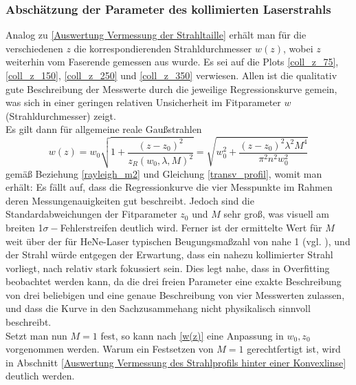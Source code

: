\documentclass[11pt,a4paper,oneside]{scrartcl}
\begin{document}
\subsubsection{Abschätzung der Parameter des kollimierten Laserstrahls}\label{Auswertung Abschätzung der Parameter des kollimierten Laserstrahls}
Analog zu \ref{Auswertung Vermessung der Strahltaille} erhält man für die verschiedenen $z$ die korrespondierenden Strahldurchmesser $w(z)$, wobei $z$ weiterhin vom Faserende gemessen aus wurde. Es sei auf die Plots \ref{coll_z_75}, \ref{coll_z_150}, \ref{coll_z_250} und \ref{coll_z_350} verwiesen. Allen ist die qualitativ gute Beschreibung der Messwerte durch die jeweilige Regressionskurve gemein, was sich in einer geringen relativen Unsicherheit im Fitparameter $w$ (Strahldurchmesser) zeigt.\\
Es gilt dann für allgemeine reale Gaußstrahlen
\begin{equation}\label{w(z)}
w(z)=w_0\sqrt{1+\frac{(z-z_0)^2}{z_R(w_0,\lambda,M)^2}}=\sqrt{w_0^2+\frac{(z-z_0)^2\lambda^2M^4}{\pi^2n^2w_0^2}}
\end{equation}
gemäß Beziehung \ref{rayleigh_m2} und Gleichung \ref{transv_profil}, womit man  erhält: 
Es fällt auf, dass die Regressionkurve die vier Messpunkte im Rahmen deren Messungenauigkeiten gut beschreibt. Jedoch sind die Standardabweichungen der Fitparameter $z_0$ und $M$ sehr groß, was visuell am breiten 1$\sigma-$Fehlerstreifen deutlich wird. Ferner ist der ermittelte Wert für $M$ weit über der für HeNe-Laser typischen Beugungsmaßzahl von nahe 1 (vgl. \cite{paschotta2008beam}), und der Strahl würde entgegen der Erwartung, dass ein nahezu kollimierter Strahl vorliegt, nach  relativ stark fokussiert sein. Dies legt nahe, dass in  Overfitting beobachtet werden kann, da die drei freien Parameter eine exakte Beschreibung von drei beliebigen und eine genaue Beschreibung von vier Messwerten zulassen, und dass die Kurve in  den Sachzusammehang nicht physikalisch sinnvoll beschreibt.\\
Setzt man nun $M=1$ fest, so kann nach \ref{w(z)} eine Anpassung in $w_0,z_0$ vorgenommen werden. Warum ein Festsetzen von $M=1$ gerechtfertigt ist, wird in Abschnitt \ref{Auswertung Vermessung des Strahlprofils hinter einer Konvexlinse} deutlich werden.
\end{document}
